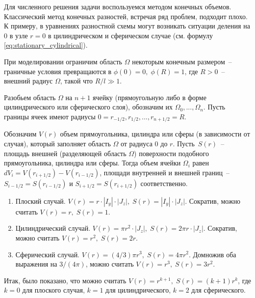 Для численного решения задачи воспользуемся методом конечных объемов. Классический метод конечных разностей, встречая ряд проблем, подходит плохо. К примеру, в уравнениях разностной схемы могут возникать ситуации деления на 0 в узле $r = 0$ в цилиндрическом и сферическом случае (см. формулу \eqref{eq:stationary_cylindrical}).

При моделировании ограничим область $\Omega$ некоторым конечным размером~-- граничные условия превращаются в $\phi(0) = 0, \; \phi(R) = 1$, где $R > 0$~-- внешний радиус $\Omega$, такой что $R / l \gg 1$.

Разобьем область $\Omega$ на $n + 1$ ячейку (прямоугольную либо в форме цилиндрического или сферического слоя), обозначим их $\Omega_0, ..., \Omega_n$. Пусть границы ячеек имеют радиусы $0 = r_{-1/2}, r_{1/2}, ..., r_{n + 1/2} = R$.

Обозначим $V(r)$ объем прямоугольника, цилиндра или сферы (в зависимости от случая), который заполняет область $\Omega$ от радиуса $0$ до $r$. \linebreak Пусть~$S(r)$~-- площадь внешней (разделяющей область $\Omega$) поверхности подобного прямоугольника, цилиндра или сферы. Тогда объем ячейки $\Omega_i$ равен $dV_i = V(r_{i + 1/2}) - V(r_{i - 1/2})$, площади внутренней и внешней границ~-- $S_{i - 1/2} = S(r_{i - 1/2})$ и $S_{i + 1/2} = S(r_{i + 1/2})$ соответственно.

\begin{enumerate}[label=\arabic*.]
	\item Плоский случай. $V(r) = r \cdot |I_y| \cdot |J_z|, \; S(r) = |I_y| \cdot |J_z|$. Сократив, можно считать $V(r) = r, \; S(r) = 1$.
	\item Цилиндрический случай. $V(r) = \pi r^2 \cdot |J_z|, \; S(r) = 2 \pi r \cdot |J_z|$. Сократив, можно считать $V(r) = r^2, \; S(r) = 2r$.
	\item Сферический случай. $V(r) = (4/3) \pi r^3, \; S(r) = 4 \pi r^2$. Домножив оба выражения на $3/(4\pi)$, можно считать $V(r) = r^3, \; S(r) = 3 r^2$.
\end{enumerate}

Итак, было показано, что можно считать $V(r) = r^{k + 1}, \; S(r) = (k + 1)r^k$, где $k = 0$ для плоского случая, $k = 1$ для цилиндрического, $k = 2$ для сферического.

